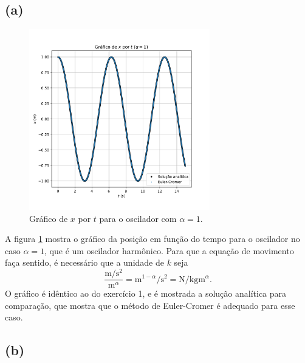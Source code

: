 \documentclass[a4paper, brazil]{article}
\begin{document}
\subsection{(a)}

\begin{figure}[ht]
\centering
\includegraphics[width=0.7\textwidth]{fig3a.pdf}
\caption{Gráfico de \( x \) por \( t \) para o oscilador com \( \alpha = 1 \).}
\label{fig3a}
\end{figure}

A figura \ref{fig3a} mostra o gráfico da posição em função do tempo para o oscilador no caso \( \alpha = 1 \), que é um oscilador harmônico. Para que a equação de movimento faça sentido, é necessário que a unidade de \( k \) seja
\[ \frac{ \si{\meter\per\second\squared}}{ \si{\meter^\alpha} } = \si{\meter^{1 - \alpha}\per\second\squared} = \si{\newton\per\kilogram\metre^{\alpha}} . \]
O gráfico é idêntico ao do exercício 1, e é mostrada a solução analítica para comparação, que mostra que o método de Euler-Cromer é adequado para esse caso.

\newpage
\subsection{(b)}
\end{document}
